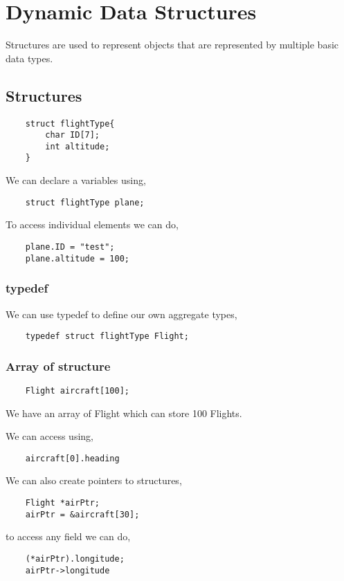 \setcounter{chapter}{18}
\chapter{Dynamic Data Structures}
Structures are used to represent objects that are represented by multiple basic data types.

\section{Structures}
\begin{verbatim}
    struct flightType{
        char ID[7];
        int altitude;
    }
\end{verbatim}

We can declare a variables using, 
\begin{verbatim}
    struct flightType plane;
\end{verbatim}
To access individual elements we can do,
\begin{verbatim}
    plane.ID = "test";
    plane.altitude = 100;
\end{verbatim}

\subsection{typedef}
We can use typedef to define our own aggregate types,
\begin{verbatim}
    typedef struct flightType Flight;
\end{verbatim}

\subsection{Array of structure}
\begin{verbatim}
    Flight aircraft[100];
\end{verbatim}
We have an array of Flight which can store 100 Flights.

We can access using, 
\begin{verbatim}
    aircraft[0].heading
\end{verbatim}

We can also create pointers to structures, 
\begin{verbatim}
    Flight *airPtr;
    airPtr = &aircraft[30];
\end{verbatim}
to access any field we can do,
\begin{verbatim}
    (*airPtr).longitude;
    airPtr->longitude
\end{verbatim}



